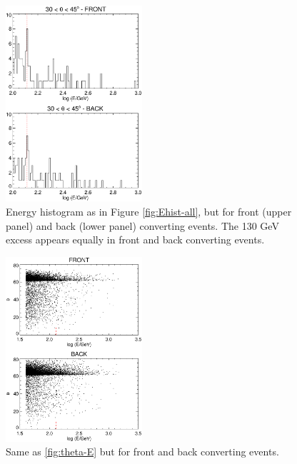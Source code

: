 \documentclass[aps,twocolumn,prd,superscriptaddress,showpacs,nofootinbib,fixfloat]{revtex4}
\begin{document}
\begin{figure}
\centering
\includegraphics[width=0.45\textwidth]{plots/Ehist-frontback.ps}
\caption{Energy histogram as in Figure \ref{fig:Ehist-all}, but for front
  (upper panel) and back (lower panel) converting events.  The 130 GeV excess
  appears equally in front and back converting events. 
}
\label{fig:Ehist-frontback}
\end{figure}



\begin{figure}
\centering
\includegraphics[width=0.45\textwidth]{plots/theta-E-frontback.ps}
\caption{Same as \ref{fig:theta-E} but for front and back converting events.}
\label{fig:theta-E-frontback}
\end{figure}
\end{document}
